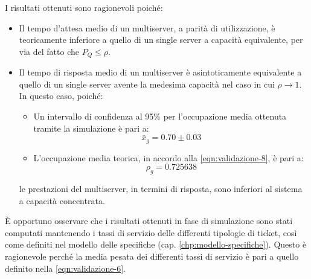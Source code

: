 I risultati ottenuti sono ragionevoli poiché:
\begin{itemize}
\item Il tempo d'attesa medio di un multiserver, a parità di utilizzazione, è teoricamente inferiore a quello di un single server a capacità equivalente, per via del fatto che $P_Q \leq \rho$.
\item Il tempo di risposta medio di un multiserver è asintoticamente equivalente a quello di un single server avente la medesima capacità nel caso in cui $\rho\to 1$. In questo caso, poiché:
\begin{itemize}
\item Un intervallo di confidenza al 95\% per l'occupazione media ottenuta tramite la simulazione è pari a:
\begin{equation}
\bar{x}_g = 0.70 \pm 0.03
\end{equation}
\item L'occupazione media teorica, in accordo alla \ref{eqn:validazione-8}, è pari a:
\begin{equation}
\rho_g = 0.725638
\end{equation}
\end{itemize}
le prestazioni del multiserver, in termini di risposta, sono inferiori al sistema a capacità concentrata.
\end{itemize}

È opportuno osservare che i risultati ottenuti in fase di simulazione sono stati computati mantenendo i tassi di servizio delle differenti tipologie di ticket, così come definiti nel modello delle specifiche (cap. \ref{chp:modello-specifiche}). Questo è ragionevole perché la media pesata dei differenti tassi di servizio è pari a quello definito nella \ref{eqn:validazione-6}.


